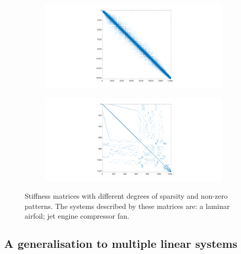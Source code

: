 \documentclass[twoside]{article}
\begin{document}
		\begin{figure}[h!]
			\centering
			\begin{subfigure}{0.28\textwidth}
				\includegraphics[width=\textwidth,trim={390 40 400 40},clip]{2d_airfoil}
				\caption{}
				\label{fig:mat_foil}
			\end{subfigure}
			\enskip
			\hspace{1cm}
			\begin{subfigure}{0.28\textwidth}
				\includegraphics[width=\textwidth,trim={390 40 400 40},clip]{2d_fan}
				\caption{}
				\label{fig:mat_fan}
			\end{subfigure}
			\caption{Stiffness matrices with different degrees of sparsity and non-zero patterns. The systems described by these matrices are: 
			 a laminar airfoil;  jet engine compressor fan.}
			\label{fig:matrices}
		\end{figure}





\subsection*{A generalisation to multiple linear systems}
\end{document}
